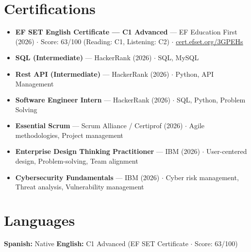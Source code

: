 \documentclass[letterpaper,10pt]{article}
\newcommand{\resumeItem}[1]{
  \item\small{
    {#1 \vspace{-2pt}}
  }
}
\begin{document}
\section{Certifications}
  \begin{itemize}[leftmargin=0.15in, labelsep=5pt, itemsep=2pt]
    \resumeItem{\textbf{EF SET English Certificate --- C1 Advanced} --- EF Education First (2026) $\cdot$ Score: 63/100 (Reading: C1, Listening: C2) $\cdot$ \href{https://cert.efset.org/3GPEHs}{\underline{cert.efset.org/3GPEHs}}}
    \resumeItem{\textbf{SQL (Intermediate)} --- HackerRank (2026) $\cdot$ SQL, MySQL}
    \resumeItem{\textbf{Rest API (Intermediate)} --- HackerRank (2026) $\cdot$ Python, API Management}
    \resumeItem{\textbf{Software Engineer Intern} --- HackerRank (2026) $\cdot$ SQL, Python, Problem Solving}
    \resumeItem{\textbf{Essential Scrum} --- Scrum Alliance / Certiprof (2026) $\cdot$ Agile methodologies, Project management}
    \resumeItem{\textbf{Enterprise Design Thinking Practitioner} --- IBM (2026) $\cdot$ User-centered design, Problem-solving, Team alignment}
    \resumeItem{\textbf{Cybersecurity Fundamentals} --- IBM (2026) $\cdot$ Cyber risk management, Threat analysis, Vulnerability management}
  \end{itemize}

\section{Languages}
  \begin{itemize}[leftmargin=0.15in, label={}]
    \small{\item{
      \textbf{Spanish:}{ Native} \hspace{25pt}
      \textbf{English:}{ C1 Advanced (EF SET Certificate $\cdot$ Score: 63/100)}
    }}
  \end{itemize}
\end{document}
